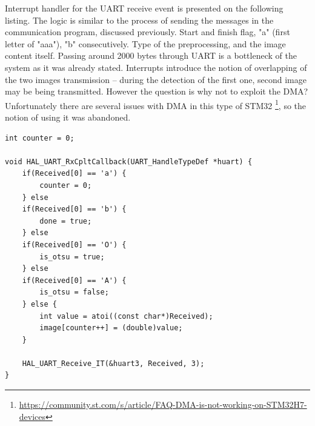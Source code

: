 Interrupt handler for the UART receive event is presented on the following listing. The logic is similar to the process of sending the messages in the communication program, discussed previously. Start and finish flag, "a" (first letter of "aaa"), "b" consecutively. Type of the preprocessing, and the image content itself. Passing around 2000 bytes through UART is a bottleneck of the system as it was already stated. Interrupts introduce the notion of overlapping of the two images transmission -- during the detection of the first one, second image may be being transmitted. However the question is why not to exploit the DMA? Unfortunately there are several issues with DMA in this type of STM32 \footnote{\url{https://community.st.com/s/article/FAQ-DMA-is-not-working-on-STM32H7-devices}}, so the notion of using it was abandoned.
\begin{verbatim}
int counter = 0;

void HAL_UART_RxCpltCallback(UART_HandleTypeDef *huart) {
	if(Received[0] == 'a') {
		counter = 0;
	} else
	if(Received[0] == 'b') {
		done = true;
	} else
	if(Received[0] == 'O') {
		is_otsu = true;
	} else
	if(Received[0] == 'A') {
		is_otsu = false;
	} else {
		int value = atoi((const char*)Received);
		image[counter++] = (double)value;
	}

	HAL_UART_Receive_IT(&huart3, Received, 3);
}
\end{verbatim}

\begingroup
\renewcommand{\cleardoublepage}{}
\renewcommand{\clearpage}{}
